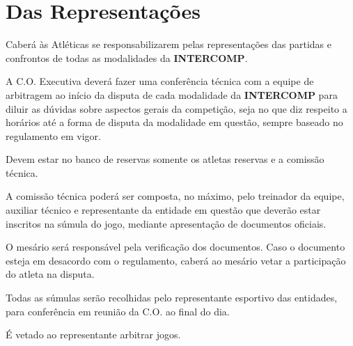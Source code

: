 {\let\clearpage\relax \chapter{Das Representações}}

\begin{article}
	Caberá às Atléticas se responsabilizarem pelas representações das partidas e confrontos de todas as modalidades da \textbf{INTERCOMP}.
\end{article}

\begin{article}
	A C.O. Executiva deverá fazer uma conferência técnica com a equipe de arbitragem ao início da disputa de cada modalidade da \textbf{INTERCOMP} para diluir as dúvidas sobre aspectos gerais da competição, seja no que diz respeito a horários até a forma de disputa da modalidade em questão, sempre baseado no regulamento em vigor.

	\begin{xparagraph}
		Devem estar no banco de reservas somente os atletas reservas e a comissão técnica.
	\end{xparagraph}

	\begin{xparagraph}
		A comissão técnica poderá ser composta, no máximo, pelo treinador da equipe, auxiliar técnico e representante da entidade em questão que deverão estar inscritos na súmula do jogo, mediante apresentação de documentos oficiais.
	\end{xparagraph}

	\begin{xparagraph}
		O mesário será responsável pela verificação dos documentos. Caso o documento esteja em desacordo com o regulamento, caberá ao mesário vetar a participação do atleta na disputa.
	\end{xparagraph}

	\begin{xparagraph}
		Todas as súmulas serão recolhidas pelo representante esportivo das entidades, para conferência em reunião da C.O. ao final do dia.
	\end{xparagraph}
\end{article}

\begin{article}
	É vetado ao representante arbitrar jogos.
\end{article}
